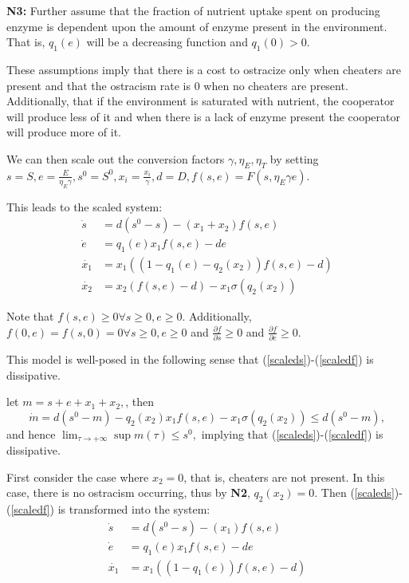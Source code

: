 \documentclass[12pt]{article}
\begin{document}
\noindent \textbf{N3: } Further assume that the fraction of nutrient uptake spent on producing enzyme is dependent upon the amount of enzyme present in the environment. That is, $q_1(e)$ will be a decreasing function and $q_1(0)>0$. 

These assumptions imply that there is a cost to ostracize only when cheaters are present and that the ostracism rate is 0 when no cheaters are present. Additionally, that if the environment is saturated with nutrient, the cooperator will produce less of it and when there is a lack of enzyme present the cooperator will produce more of it. 

\noindent We can then scale out the conversion factors $\gamma, \eta_E , \eta_T$ by setting $s=S, e=\frac{E}{\eta_E \gamma}, s^0=S^0, x_i=\frac{x_i}{\gamma}, d=D, f(s,e)=F(s,\eta_E \gamma e)$. 

This leads to the scaled system: 
\begin{align}
\dot{s}&=d(s^0-s)-(x_1 + x_2) f(s,e) \label{scaleds}\\
\dot{e}&=q_1(e) x_1 f(s,e)-de\\
\dot{x_1} &= x_1((1-q_1(e)-q_2(x_2))f(s,e)-d)\\
\dot{x_2}&=x_2(f(s,e)-d)-x_1 \sigma(q_2(x_2))\label{scaledf}
\end{align}

\noindent Note that $f(s,e) \geq 0 \forall s \geq 0, e \geq 0.$ Additionally, $f(0,e)=f(s,0)=0 \forall s\geq 0, e\geq 0$ and $\frac{\partial f}{\partial s} \geq 0$ and $\frac{\partial f}{\partial e} \geq 0$.  

\noindent This model is well-posed in the following sense that (\ref{scaleds})-(\ref{scaledf}) is dissipative.

\noindent let $m=s+e+x_1+x_2,$, then $$\dot{m}=d(s^0-m)-q_2(x_2 )x_1 f(s,e)- x_1 \sigma(q_2(x_2)) \leq d(s^0-m),$$ and hence $\lim_{\tau \rightarrow +\infty} \sup m(\tau) \leq s^0,$ implying that (\ref{scaleds})-(\ref{scaledf}) is dissipative.

\noindent First consider the case where $x_2=0$, that is, cheaters are not present. In this case, there is no ostracism occurring, thus by \textbf{N2}, $q_2(x_2) =0$. Then (\ref{scaleds})-(\ref{scaledf}) is transformed into the system: 
\begin{align}
\dot{s}&=d(s^0-s)-(x_1) f(s,e) \label{nox2s}\\
\dot{e}&=q_1(e) x_1 f(s,e)-de\\
\dot{x_1} &= x_1((1-q_1(e))f(s,e)-d)\label{nox2f}
\end{align}
\end{document}
